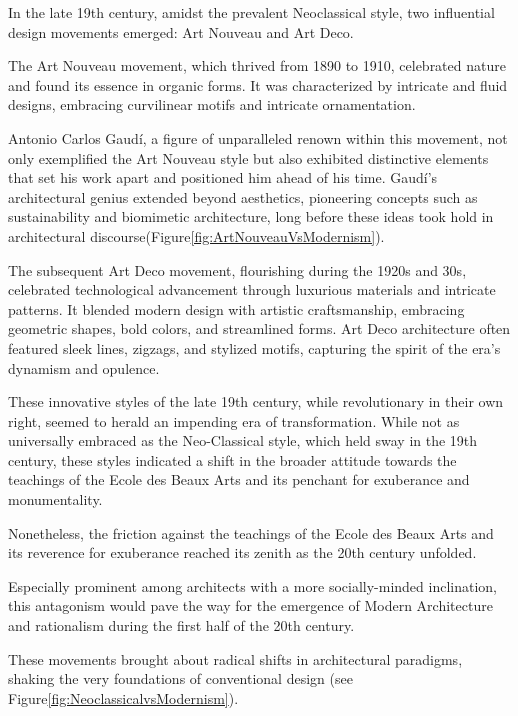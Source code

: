 In the late 19th century, amidst the prevalent Neoclassical style, two influential design movements emerged: Art Nouveau and Art Deco.

The Art Nouveau movement, which thrived from 1890 to 1910, celebrated nature and found its essence in organic forms.
It was characterized by intricate and fluid designs, embracing curvilinear motifs and intricate ornamentation.

Antonio Carlos Gaudí, a figure of unparalleled renown within this movement, not only exemplified the Art Nouveau style but also exhibited distinctive elements that set his work apart and positioned him ahead of his time.
Gaudí's architectural genius extended beyond aesthetics, pioneering concepts such as sustainability and biomimetic architecture, long before these ideas took hold in architectural discourse\cite{Salas2018}(Figure\ref{fig:ArtNouveauVsModernism}).

The subsequent Art Deco movement, flourishing during the 1920s and 30s, celebrated technological advancement through luxurious materials and intricate patterns.
It blended modern design with artistic craftsmanship, embracing geometric shapes, bold colors, and streamlined forms.
Art Deco architecture often featured sleek lines, zigzags, and stylized motifs, capturing the spirit of the era's dynamism and opulence\cite{Arora2023}.

These innovative styles of the late 19th century, while revolutionary in their own right, seemed to herald an impending era of transformation.
While not as universally embraced as the Neo-Classical style, which held sway in the 19th century, these styles indicated a shift in the broader attitude towards the teachings of the Ecole des Beaux Arts and its penchant for exuberance and monumentality.

Nonetheless, the friction against the teachings of the Ecole des Beaux Arts and its reverence for exuberance reached its zenith as the 20th century unfolded.

Especially prominent among architects with a more socially-minded inclination, this antagonism would pave the way for the emergence of Modern Architecture and rationalism during the first half of the 20th century.

These movements brought about radical shifts in architectural paradigms, shaking the very foundations of conventional design (see Figure\ref{fig:NeoclassicalvsModernism}).

